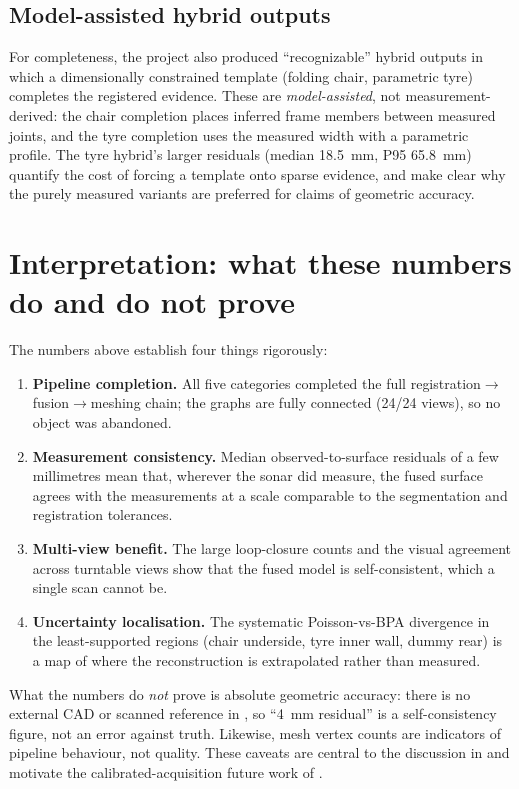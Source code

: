 \subsection{Model-assisted hybrid outputs}
For completeness, the project also produced ``recognizable'' hybrid outputs in
which a dimensionally constrained template (folding chair, parametric tyre)
completes the registered evidence. These are \emph{model-assisted}, not
measurement-derived: the chair completion places inferred frame members
between measured joints, and the tyre completion uses the measured width with a
parametric profile. The tyre hybrid's larger residuals (median 18.5~mm,
P95 65.8~mm) quantify the cost of forcing a template onto sparse evidence, and
make clear why the purely measured variants are preferred for claims of
geometric accuracy.

\section{Interpretation: what these numbers do and do not prove}
\label{sec:resultsA_interpretation}

The numbers above establish four things rigorously:

\begin{enumerate}
  \item \textbf{Pipeline completion.} All five categories completed the full
  registration$\to$fusion$\to$meshing chain; the graphs are fully connected
  (24/24 views), so no object was abandoned.
  \item \textbf{Measurement consistency.} Median observed-to-surface residuals
  of a few millimetres mean that, wherever the sonar did measure, the fused
  surface agrees with the measurements at a scale comparable to the
  segmentation and registration tolerances.
  \item \textbf{Multi-view benefit.} The large loop-closure counts and the
  visual agreement across turntable views show that the fused model is
  self-consistent, which a single scan cannot be.
  \item \textbf{Uncertainty localisation.} The systematic Poisson-vs-BPA
  divergence in the least-supported regions (chair underside, tyre inner wall,
  dummy rear) is a map of where the reconstruction is extrapolated rather than
  measured.
\end{enumerate}

What the numbers do \emph{not} prove is absolute geometric accuracy: there is
no external CAD or scanned reference in \suop{}, so ``4~mm residual'' is a
self-consistency figure, not an error against truth. Likewise, mesh vertex
counts are indicators of pipeline behaviour, not quality. These caveats are
central to the discussion in  and motivate the
calibrated-acquisition future work of .
